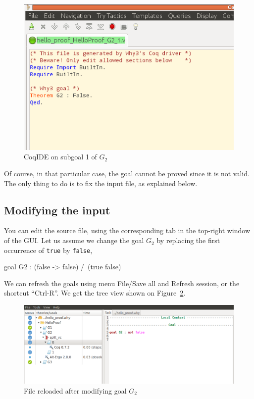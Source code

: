 \begin{figure}[tbp]
  \includegraphics[width=\textwidth]{coqide-0-81.png}
  \caption{CoqIDE on subgoal 1 of $G_2$}
  \label{fig:coqide}
\end{figure}

Of course, in that particular case, the goal cannot be proved since it
is not valid. The only thing to do is to fix the input file, as
explained below.

\subsection{Modifying the input}

You can edit the source file, using the corresponding tab in the
top-right window of the GUI.
Let us assume we
change the goal $G_2$ by replacing the first occurrence of \texttt{true} by
\texttt{false}, \eg
\begin{whycode}
  goal G2 : (false -> false) /\ (true \/ false)
\end{whycode}
We can refresh the goals using menu \textsf{File/Save all and Refresh
  session}, or the shortcut ``Ctrl-R''. We get the tree view shown on
Figure~\ref{fig:gui5}.

\begin{figure}[tbp]
  \includegraphics[width=\textwidth]{gui-5.png}
  \caption{File reloaded after modifying goal $G_2$}
  \label{fig:gui5}
\end{figure}

